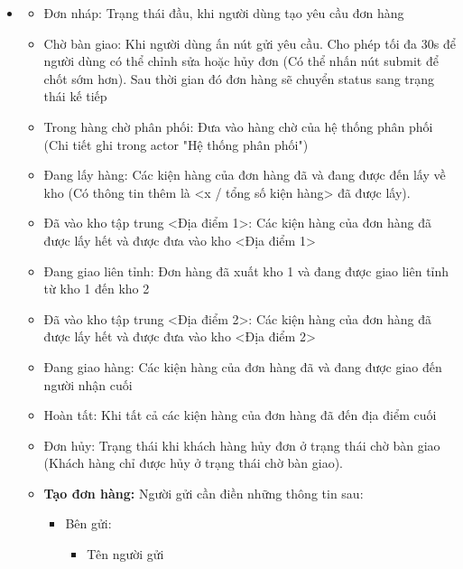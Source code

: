 \begin{itemize}
	\item 
	\begin{itemize}
		\item Đơn nháp: Trạng thái đầu, khi người dùng tạo yêu cầu đơn hàng
		\item Chờ bàn giao: Khi người dùng ấn nút gửi yêu cầu. Cho phép tối đa 30s để người dùng có thể chỉnh sửa hoặc hủy đơn (Có thể nhấn nút submit để chốt sớm hơn). Sau thời gian đó đơn hàng sẽ chuyển status sang trạng thái kế tiếp
		\item Trong hàng chờ phân phối: Đưa vào hàng chờ của hệ thống phân phối (Chi tiết ghi trong actor "Hệ thống phân phối")
		\item Đang lấy hàng: Các kiện hàng của đơn hàng đã và đang được đến lấy về kho (Có thông tin thêm là <x / tổng số kiện hàng> đã được lấy).
		\item Đã vào kho tập trung <Địa điểm 1>: Các kiện hàng của đơn hàng đã được lấy hết và được đưa vào kho <Địa điểm 1> 
		\item Đang giao liên tỉnh: Đơn hàng đã xuất kho 1 và đang được giao liên tỉnh từ kho 1 đến kho 2
		\item Đã vào kho tập trung <Địa điểm 2>: Các kiện hàng của đơn hàng đã được lấy hết và được đưa vào kho <Địa điểm 2>
		\item Đang giao hàng: Các kiện hàng của đơn hàng đã và đang được giao đến người nhận cuối
		\item Hoàn tất: Khi tất cả các kiện hàng của đơn hàng đã đến địa điểm cuối
		\item Đơn hủy: Trạng thái khi khách hàng hủy đơn ở trạng thái chờ bàn giao (Khách hàng chỉ được hủy ở trạng thái chờ bàn giao).
	\end{itemize}
	\begin{itemize}
		\item \textbf{Tạo đơn hàng:} Người gửi cần điền những thông tin sau: 
		\begin{itemize}
			\item Bên gửi:
			\begin{itemize}
				\item Tên người gửi

\end{itemize}
\end{itemize}
\end{itemize}
\end{itemize}
